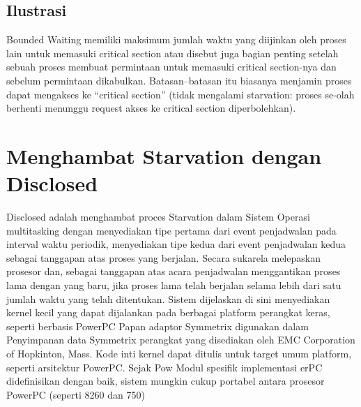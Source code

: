 \subsection{Ilustrasi}

Bounded Waiting memiliki maksimum jumlah waktu yang diijinkan oleh proses lain untuk memasuki critical section atau disebut juga bagian penting  setelah sebuah proses membuat permintaan untuk memasuki critical section-nya dan sebelum permintaan dikabulkan. Batasan–batasan itu biasanya menjamin proses dapat mengakses ke “critical section” (tidak mengalami starvation: proses se-olah berhenti menunggu request akses ke critical section diperbolehkan).


\section {Menghambat Starvation dengan Disclosed}
Disclosed adalah menghambat proces Starvation dalam Sistem Operasi multitasking dengan menyediakan tipe pertama dari event penjadwalan pada interval waktu periodik, menyediakan tipe kedua dari event penjadwalan kedua sebagai tanggapan atas proses yang berjalan. Secara sukarela melepaskan prosesor dan, sebagai tanggapan atas acara penjadwalan menggantikan proses lama dengan yang baru, jika proses lama telah berjalan selama lebih dari satu jumlah waktu yang telah ditentukan. Sistem dijelaskan di sini menyediakan kernel kecil yang dapat dijalankan pada berbagai platform perangkat keras, seperti berbasis PowerPC Papan adaptor Symmetrix digunakan dalam Penyimpanan data Symmetrix perangkat yang disediakan oleh EMC Corporation of Hopkinton, Mass. Kode inti kernel dapat ditulis untuk target umum platform, seperti arsitektur PowerPC. Sejak Pow Modul spesifik implementasi erPC didefinisikan dengan baik, sistem mungkin cukup portabel antara prosesor PowerPC (seperti 8260 dan 750)



